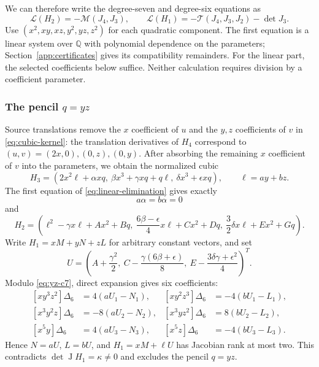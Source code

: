 \documentclass[11pt,reqno]{amsart}
\numberwithin{equation}{section}
\theoremstyle{plain}
\theoremstyle{definition}
\theoremstyle{remark}
\newcommand{\J}{\operatorname J}
\newcommand{\Mi}{\mathcal M}
\newcommand{\Tri}{\mathcal T}
\begin{document}
We can therefore write the degree-seven and degree-six equations as
\begin{equation}\label{eq:linear-elimination}
\mathcal L(H_2)=-\Mi(J_4,J_3),\qquad
\mathcal L(H_1)=-\Tri(J_4,J_3,J_2)-\det J_3.
\end{equation}
Use $(x^2,xy,xz,y^2,yz,z^2)$ for each quadratic component. The first
equation is a linear system over $\mathbb Q$ with polynomial dependence on
the parameters; Section~\ref{app:certificates} gives its compatibility
remainders. For the linear part, the selected coefficients below suffice.
Neither calculation requires division by a coefficient parameter.

\subsubsection{\texorpdfstring{The pencil $q=yz$}{The pencil q=yz}}
Source translations remove the $x$ coefficient of $u$ and the $y,z$ coefficients of $v$ in \eqref{eq:cubic-kernel}: the translation derivatives of $H_4$ correspond to $(u,v)=(2x,0),(0,z),(0,y)$. After absorbing the remaining $x$ coefficient of $v$ into the parameters, we obtain the normalized cubic
\begin{equation}\label{eq:yz-cubic}
H_3=(2x^2\ell+\alpha xq,\ \beta x^3+\gamma xq+q\ell,\ \delta x^3+\epsilon xq),
\qquad \ell=ay+bz.
\end{equation}
The first equation of \eqref{eq:linear-elimination} gives exactly
\begin{equation}\label{eq:yz-c7}
a\alpha=b\alpha=0
\end{equation}
and
\begin{equation}\label{eq:yz-quadratic}
H_2=\left(\ell^2-\gamma x\ell+Ax^2+Bq,\
\frac{6\beta-\epsilon}{4}x\ell+Cx^2+Dq,\
\frac32\delta x\ell+Ex^2+Gq\right).
\end{equation}
Write $H_1=xM+yN+zL$ for arbitrary constant vectors, and set
\[
U=\left(A+\frac{\gamma^2}{2},\
C-\frac{\gamma(6\beta+\epsilon)}8,\
E-\frac{3\delta\gamma+\epsilon^2}{4}\right)^T.
\]
Modulo \eqref{eq:yz-c7}, direct expansion gives six coefficients:
\begin{equation}\label{eq:yz-selected}
\begin{aligned}
[xy^3z^2]\Delta_6&=4(aU_1-N_1),&
[xy^2z^3]\Delta_6&=-4(bU_1-L_1),\\
[x^3y^2z]\Delta_6&=-8(aU_2-N_2),&
[x^3yz^2]\Delta_6&=8(bU_2-L_2),\\
[x^5y]\Delta_6&=4(aU_3-N_3),&
[x^5z]\Delta_6&=-4(bU_3-L_3).
\end{aligned}
\end{equation}
Hence $N=aU$, $L=bU$, and $H_1=xM+\ell U$ has Jacobian rank at most two.
This contradicts $\det\J H_1=\kappa\ne0$ and excludes the pencil $q=yz$.
\end{document}

